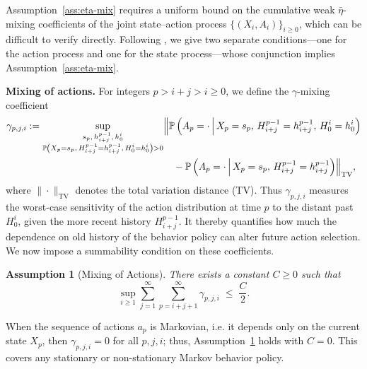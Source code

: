 \documentclass{article}
\numberwithin{equation}{section}
\newcommand{\lp}{\left(}
\newcommand{\rp}{\right)}
\newcommand{\History}{H}
\newcommand{\history}{h}
\newcommand{\Pbb}{\mathbb{P}}
\newcommand{\prob}{\Pbb}
\newtheorem{assumption}{Assumption}
\begin{document}
Assumption~\ref{ass:eta-mix} requires a uniform bound on the cumulative weak $\bar\eta$-mixing coefficients of the joint state--action process $\{(X_i,A_i)\}_{i\ge 0}$, which can be difficult to verify directly. 
Following \citet{su2025centrallimittheoremstransition,banerjee2025off}, we give two separate conditions---one for the action process and one for the state process---whose conjunction implies Assumption~\ref{ass:eta-mix}. 

\medskip\noindent\textbf{Mixing of actions.}
For integers $p > i+j > i \ge 0$, we define the $\gamma$-mixing coefficient
\begin{align*}
\gamma_{p,j,i} :=
\sup_{\substack{s_p,\,\history_{i+j}^{p-1},\,\history_0^i \\ \prob\lp X_p=s_p,\,\History_{i+j}^{p-1}=\history_{i+j}^{p-1},\,\History_0^i=\history_0^i\rp>0}}
&\Bigl\|
\prob\lp A_p=\cdot \,\Big|\, X_p=s_p,\,\History_{i+j}^{p-1}=\history_{i+j}^{p-1},\,\History_0^i=\history_0^i\rp \\
&\quad -\prob\lp A_p=\cdot \,\Big|\, X_p=s_p,\,\History_{i+j}^{p-1}=\history_{i+j}^{p-1}\rp
\Bigr\|_{\mathrm{TV}},
\end{align*}
where $\|\cdot\|_{\mathrm{TV}}$ denotes the total variation distance (TV).
Thus $\gamma_{p,j,i}$ measures the worst-case sensitivity of the action distribution at time $p$ to the distant past $H_0^i$, given the more recent history $H_{i+j}^{p-1}$. 
It thereby quantifies how much the dependence on old history of the behavior policy can alter future action selection.
We now impose a summability condition on these coefficients.
\begin{assumption}[Mixing of Actions]
\label{ass:action-mix}
There exists a constant $C\ge 0$ such that
\[
\sup_{i\ge 1}\sum_{j=1}^{\infty}\sum_{p=i+j+1}^{\infty}\gamma_{p,j,i} \;\le\; \frac{C}{2}.
\]
\end{assumption}
When the sequence of actions $a_p$ is Markovian, i.e. it depends only on the current state $X_p$, then $\gamma_{p,j,i}=0$ for all $p,j,i$; thus, Assumption~\ref{ass:action-mix} holds with $C=0$. 
This covers any stationary or non-stationary Markov behavior policy.
\end{document}
